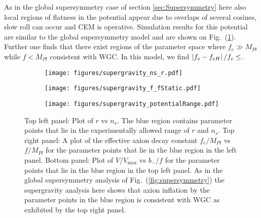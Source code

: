\documentclass[12pt]{article}
\begin{document}
As in the global supersymmetry case of section \ref{sec:Supersymmetry} here also local regions of flatness in the potential appear due to overlaps of several cosines, slow roll can occur and CEM is operative.
Simulation results for this potential are similar to the global supersymmetry model and are shown on Fig.~(\ref{fig:supergravity}).
Further one finds that there exist regions of the parameter space where $f_e \gg M_{Pl}$ while $f < M_{Pl}$ consistent with WGC.
In this model, we find $\left|f_e - f_{eH}\right| / f_e \le \protect$.

\begin{figure}
  \centering
  \begin{subfigure}{0.45 \textwidth}
    \texttt{[image: figures/supergravity\_ns\_r.pdf]}
  \end{subfigure}
  \begin{subfigure}{0.45 \textwidth}
    \texttt{[image: figures/supergravity\_f\_fStatic.pdf]}
  \end{subfigure}
  \begin{subfigure}{0.45 \textwidth}
    \texttt{[image: figures/supergravity\_potentialRange.pdf]}
  \end{subfigure}
  \caption{\protect
    Top left panel: Plot of $r$ vs $n_s$.
    The blue region contains parameter points that lie in the experimentally allowed range of $r$ and $n_s$.
    Top right panel: A plot of the effective axion decay constant $f_e / M_{Pl}$ vs $f / M_{Pl}$ for the parameter points that lie in the blue region in the left panel.
    Bottom panel: Plot of $V / V_\text{max}$ vs $b_- / f$ for the parameter points that lie in the blue region in the top left panel.
    As in the global supersymmetry analysis of Fig.~(\ref{fig:supersymmetry}) the supergravity analysis here shows that axion inflation by the parameter points in the blue region is consistent with WGC as exhibited by the top right panel.
  } \label{fig:supergravity}
\end{figure}
\end{document}

